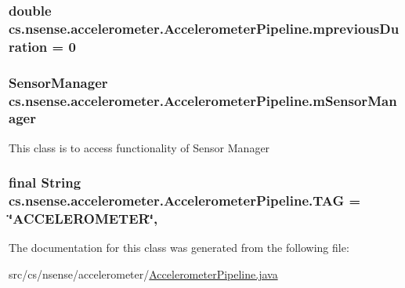 \hypertarget{classcs_1_1nsense_1_1accelerometer_1_1_accelerometer_pipeline_a7fe243bb6109305b49f8ef577025cf8f}{
\subsubsection[{mprevious\-Duration}]{\setlength{\rightskip}{0pt plus 5cm}double cs.\-nsense.\-accelerometer.\-Accelerometer\-Pipeline.\-mprevious\-Duration = 0\hspace{0.3cm}{\ttfamily [static]}}}\label{classcs_1_1nsense_1_1accelerometer_1_1_accelerometer_pipeline_a7fe243bb6109305b49f8ef577025cf8f}
\hypertarget{classcs_1_1nsense_1_1accelerometer_1_1_accelerometer_pipeline_af7db7c994e5fecda89185176f2266940}{
\subsubsection[{m\-Sensor\-Manager}]{\setlength{\rightskip}{0pt plus 5cm}Sensor\-Manager cs.\-nsense.\-accelerometer.\-Accelerometer\-Pipeline.\-m\-Sensor\-Manager\hspace{0.3cm}{\ttfamily [private]}}}\label{classcs_1_1nsense_1_1accelerometer_1_1_accelerometer_pipeline_af7db7c994e5fecda89185176f2266940}
This class is to access functionality of Sensor Manager \hypertarget{classcs_1_1nsense_1_1accelerometer_1_1_accelerometer_pipeline_ae711194fe785db6045f4b733728fa616}{
\subsubsection[{T\-A\-G}]{\setlength{\rightskip}{0pt plus 5cm}final String cs.\-nsense.\-accelerometer.\-Accelerometer\-Pipeline.\-T\-A\-G = \char`\"{}A\-C\-C\-E\-L\-E\-R\-O\-M\-E\-T\-E\-R\char`\"{}\hspace{0.3cm}{\ttfamily [static]}, {\ttfamily [private]}}}\label{classcs_1_1nsense_1_1accelerometer_1_1_accelerometer_pipeline_ae711194fe785db6045f4b733728fa616}


The documentation for this class was generated from the following file\-:\begin{DoxyCompactItemize}
\item 
src/cs/nsense/accelerometer/\hyperlink{_accelerometer_pipeline_8java}{Accelerometer\-Pipeline.\-java}\end{DoxyCompactItemize}

